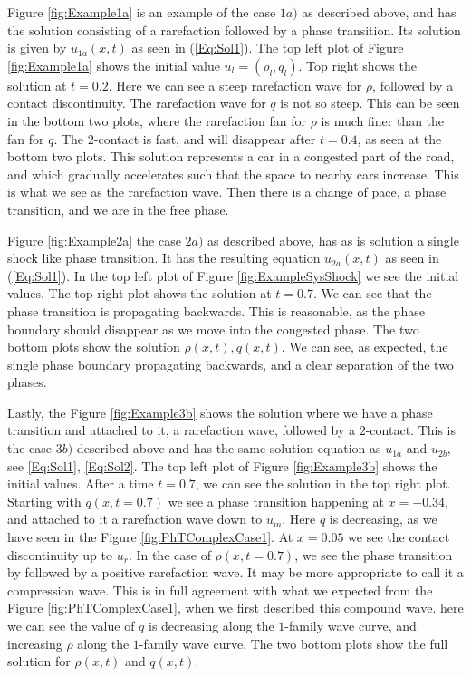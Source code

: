 \documentclass[10pt]{article}
\numberwithin{equation}{section}
\begin{document}
Figure \ref{fig:Example1a} is an example of the case $1a)$ as described above, and has the solution consisting of a rarefaction followed by a phase transition. Its solution is given by $u_{1a}(x,t)$ as seen in (\ref{Eq:Sol1}). The top left plot of Figure \ref{fig:Example1a} shows the initial value $u_l = (\rho_l, q_l)$. Top right shows the solution at $t = 0.2$. Here we can see a steep rarefaction wave for $\rho$, followed by a contact discontinuity. The rarefaction wave for $q$ is not so steep. This can be seen in the bottom two plots, where the rarefaction fan for $\rho$ is much finer than the fan for $q$.  The $2$-contact is fast, and will disappear after $t=0.4$, as seen at the bottom two plots. This solution represents a car in a congested part of the road, and which gradually accelerates such that the space to nearby cars increase. This is what we see as the rarefaction wave. Then there is a change of pace, a phase transition, and we are in the free phase. 

Figure \ref{fig:Example2a} the case $2a)$ as described above, has as is solution a single shock like phase transition. It has the resulting equation $u_{2a}(x,t)$ as seen in (\ref{Eq:Sol1}).
In the top left plot of Figure \ref{fig:ExampleSysShock} we see the initial values. The top right plot shows the solution at $t = 0.7$. We can see that the phase transition is propagating backwards. This is reasonable, as the phase boundary should disappear as we move into the congested phase. The two bottom plots show the solution $\rho(x,t), q(x,t)$. We can see, as expected, the single phase boundary propagating backwards, and a clear separation of the two phases. 

Lastly, the Figure \ref{fig:Example3b} shows the solution where we have a phase transition and attached to it, a rarefaction wave, followed by a $2$-contact. This is the case $3b)$ described above and has the same solution equation as $u_{1a}$ and $u_{2b}$, see \ref{Eq:Sol1}, \ref{Eq:Sol2}. The top left plot of Figure \ref{fig:Example3b} shows the initial values. After a time $t = 0.7$, we can see the solution in the top right plot. Starting with $q(x, t = 0.7)$ we see a phase transition happening at $x = -0.34$, and attached to it a rarefaction wave down to $u_m$. Here $q$ is decreasing, as we have seen in the Figure \ref{fig:PhTComplexCase1}. At $x = 0.05$ we see the contact discontinuity up to $u_r$. In the case of $\rho(x, t = 0.7)$, we see the phase transition by followed by a positive rarefaction wave. It may be more appropriate to call it a compression wave. This is in full agreement with what we expected from the Figure \ref{fig:PhTComplexCase1}, when we first described this compound wave. here we can see the value of $q$ is decreasing along the $1$-family wave curve, and increasing $\rho$ along the $1$-family wave curve. The two bottom plots show the full solution for $\rho(x,t)$ and $q(x,t)$.
\end{document}
